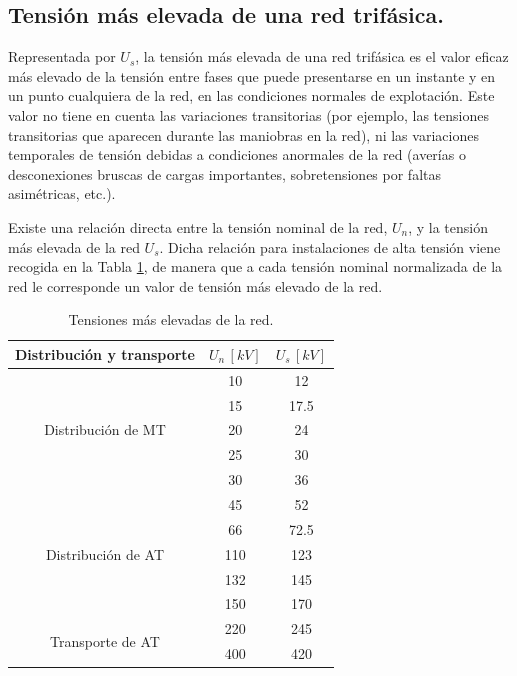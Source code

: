         \subsection{Tensión más elevada de una red trifásica.}
            Representada por $U_\textit{s}$, la tensión más elevada de una red trifásica es el valor eficaz más elevado de la tensión entre fases que puede presentarse en un instante y en un punto cualquiera de la red, en las condiciones normales de explotación. Este valor no tiene en cuenta las variaciones transitorias (por ejemplo, las tensiones transitorias que aparecen durante las maniobras en la red), ni las variaciones temporales de tensión debidas a condiciones anormales de la red (averías o desconexiones bruscas de cargas importantes, sobretensiones por faltas asimétricas, etc.).\newline
            
            Existe una relación directa entre la tensión nominal de la red, $U_\textit{n}$, y la tensión más elevada de la red $U_\textit{s}$. Dicha relación para instalaciones de alta tensión viene recogida en la Tabla \ref{tab:tensionMasElevada}, de manera que a cada tensión nominal normalizada de la red le corresponde un valor de tensión más elevado de la red.

            \begin{table}[H]
                \centering
                \renewcommand{\arraystretch}{1.1}
                \begin{tabular}{ccc}
                    Distribución y transporte & $U_\textit{n}\,[\textit{kV}]$ & $U_\textit{s}\,[\textit{kV}]$\\
                    \hline
                    \multirow{5}{*}{Distribución de MT} & 10 & 12\\
                    & 15 & 17.5 \\
                    & 20 & 24 \\
                    & 25 & 30 \\
                    & 30 & 36 \\
                    \hline
                    \multirow{5}{*}{Distribución de AT} & 45 & 52 \\
                    & 66 & 72.5 \\
                    & 110 & 123 \\
                    & 132 & 145 \\
                    & 150 & 170 \\
                    \hline
                    \multirow{2}{*}{Transporte de AT}& 220 & 245 \\
                    & 400 & 420 \\ 
                \end{tabular}
                \caption{Tensiones más elevadas de la red.}
                \label{tab:tensionMasElevada}
            \end{table}

